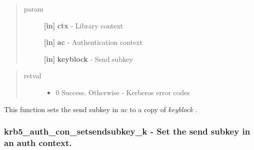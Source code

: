 \documentclass[letterpaper,10pt,english]{sphinxmanual}
\begin{document}
\begin{quote}\begin{description}
\item[{param}] \leavevmode
\textbf{{[}in{]}} \textbf{ctx} - Library context

\textbf{{[}in{]}} \textbf{ac} - Authentication context

\textbf{{[}in{]}} \textbf{keyblock} - Send subkey

\end{description}\end{quote}
\begin{quote}\begin{description}
\item[{retval}] \leavevmode\begin{itemize}
\item {} 
0   Success. Otherwise - Kerberos error codes

\end{itemize}

\end{description}\end{quote}

This function sets the send subkey in \emph{ac} to a copy of \emph{keyblock} .


\subsubsection{krb5\_auth\_con\_setsendsubkey\_k -  Set the send subkey in an auth context.}
\label{appdev/refs/api/krb5_auth_con_setsendsubkey_k:krb5-auth-con-setsendsubkey-k-set-the-send-subkey-in-an-auth-context}\label{appdev/refs/api/krb5_auth_con_setsendsubkey_k::doc}

\begin{fulllineitems}
\label{appdev/refs/api/krb5_auth_con_setsendsubkey_k:krb5_auth_con_setsendsubkey_k}
\end{fulllineitems}
\end{document}
